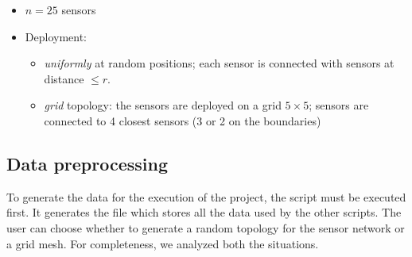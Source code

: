 \begin{itemize}
    \item $n = 25$ sensors
    \item Deployment:
    \begin{itemize}
        \item \emph{uniformly} at random positions; each sensor is connected with sensors at distance $\le r$.
        \item \emph{grid} topology: the sensors are deployed on a grid $5 \times 5$; sensors are connected to 
        4 closest sensors (3 or 2 on the boundaries)
    \end{itemize}
\end{itemize}

\subsection{Data preprocessing}

To generate the data for the execution of the project, the script  must be executed first.
It generates the file  which stores all the data used by the other scripts. The user can choose
whether to generate a random topology for the sensor network or a grid mesh. For completeness, we analyzed both the
situations.

